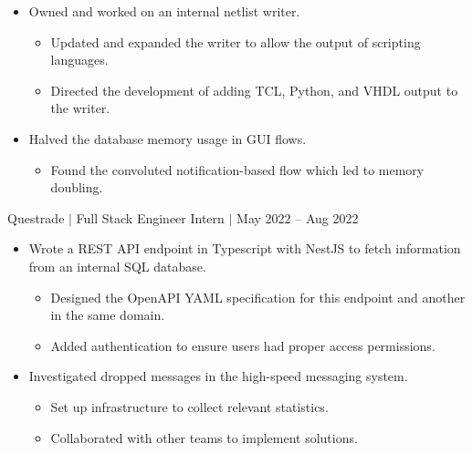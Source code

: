 \documentclass[12pt]{article}
\newcommand{\textDate}[3]{\noindent#1 $|$ #2 $|$ {\color{textGray} #3}}
\begin{document}
\begin{small}
\begin{itemize}
            \item {\color{textGray} Owned and worked on an internal netlist writer.}
                \begin{itemize}[label=$\circ$,topsep=-5px,partopsep=0px]
                    \itemsep0em 
                    \item {\color{textGray} Updated and expanded the writer to allow the output of scripting languages.}
                    \item {\color{textGray} Directed the development of adding TCL, Python, and VHDL output to the writer.}
                \end{itemize}

            \item {\color{textGray} Halved the database memory usage in GUI flows.}
                \begin{itemize}[label=$\circ$,topsep=-5px,partopsep=0px]
                    \itemsep0em 
                    \item {\color{textGray} Found the convoluted notification-based flow which led to memory doubling.}
                \end{itemize}
        \end{itemize}
    \end{small}


    \textDate{Questrade}{Full Stack Engineer Intern}{May 2022 -- Aug 2022}
    \begin{small}
        \begin{itemize}
            \itemsep0em 
            \item {\color{textGray} Wrote a REST API endpoint in Typescript with NestJS to fetch information from an internal SQL database.}
                \begin{itemize}[label=$\circ$,topsep=-5px,partopsep=0px]
                    \itemsep0em 
                    \item {\color{textGray} Designed the OpenAPI YAML specification for this endpoint and another in the same domain.}
                    \item {\color{textGray} Added authentication to ensure users had proper access permissions.}
                \end{itemize}
            \item {\color{textGray} Investigated dropped messages in the high-speed messaging system.}
                \begin{itemize}[label=$\circ$,topsep=-5px,partopsep=0px]
                    \itemsep0em 
                    \item {\color{textGray} Set up infrastructure to collect relevant statistics.}
                    \item {\color{textGray} Collaborated with other teams to implement solutions.}
                \end{itemize}
        \end{itemize}
    \end{small}
\end{document}
